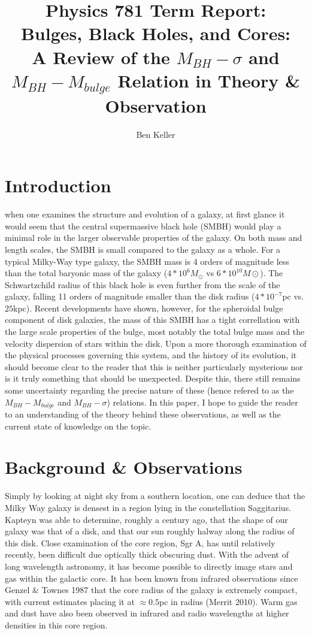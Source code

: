 \documentclass[12pt]{article}
\begin{document}
\title{Physics 781 Term Report:\\  Bulges, Black Holes, and Cores:\\ A Review of
the $M_{BH}-\sigma$ and  $M_{BH}-M_{bulge}$ Relation in Theory \& Observation}
\author{Ben Keller}
\maketitle
\newpage

\section{Introduction}
when one examines the structure and evolution of a galaxy, at first glance it 
would seem that the central supermassive black hole (SMBH) would play a 
minimal role in the larger observable properties of the galaxy.  On both mass 
and length scales, the SMBH is small compared to the galaxy as a whole.  For
a typical Milky-Way type galaxy, the SMBH mass is 4 orders of magnitude less 
than the total baryonic mass of the galaxy 
($4*10^6M_\odot$ vs $6*10^{10}M\odot$).  The Schwartzchild radius of this black
hole is even further from the scale of the galaxy, falling 11 orders of 
magnitude smaller than the disk radius ($4*10^{-7}$pc vs. $25$kpc).  Recent 
developments have shown, however, for the spheroidal bulge component of disk 
galaxies, the mass of this SMBH has a tight correllation with the large scale
properties of the bulge, most notably the total bulge mass and the velocity 
dispersion of stars within the disk.  Upon a more thorough examination of the
physical processes governing this system, and the history of its evolution, it
should become clear to the reader that this is neither particularly mysterious
nor is it truly something that should be unexpected.  Despite this, there still
remains some uncertainty regarding the precise nature of these (hence
refered to as the $M_{BH}-M_{bulge}$ and $M_{BH}-\sigma$) relations.  In this
paper, I hope to guide the reader to an understanding of the theory behind these
observations, as well as the current state of knowledge on the topic.

\section{Background \& Observations}
Simply by looking at night sky from a southern location, one can deduce that
the Milky Way galaxy is densest in a region lying in the constellation 
Saggitarius.  Kapteyn was able to determine, roughly a century ago, that the
shape of our galaxy was that of a disk, and that our sun roughly halway along
the radius of this disk.  Close examination of the core region, Sgr A, has 
until relatively recently, been difficult due optically thick obscuring dust.
With the advent of long wavelength astronomy, it has become possible to directly
image stars and gas within the galactic core.  It has been known from infrared
observations since Genzel \& Townes 1987 that the core radius of the galaxy is
extremely compact, with current estimates placing it at $\approx 0.5$pc in
radius (Merrit 2010).  Warm gas and dust have also been observed in infrared and
radio wavelengths at higher densities in this core region.
\end{document}
